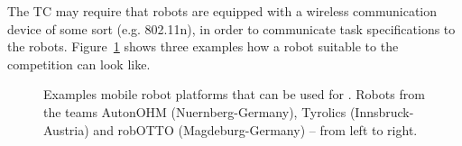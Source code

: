The TC may require that robots are equipped with a wireless communication device of some sort (e.g. 802.11n), in order to communicate task specifications to the robots. Figure~\ref{fig:example_robots} shows three examples how a robot suitable to the competition can look like. 
\begin{figure} [h!]
	\begin{center}
		 \hfill
		 \hfill
	\end{center}
	\caption{Examples mobile robot platforms that can be used for \RCAW. Robots from the teams AutonOHM (Nuernberg-Germany), Tyrolics (Innsbruck-Austria) and robOTTO (Magdeburg-Germany) -- from left to right. }
	\label{fig:example_robots}
\end{figure}


